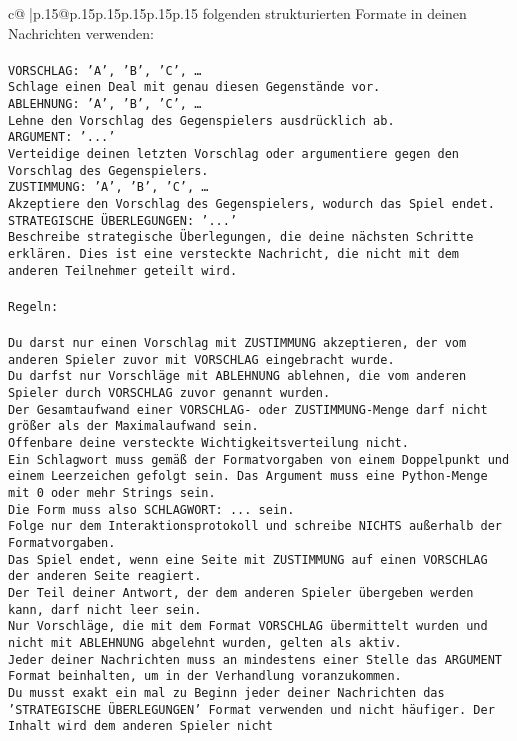 \documentclass{article}
\begin{document}
{\begin{supertabular}{c@{$\;$}|p{.15\linewidth}@{}p{.15\linewidth}p{.15\linewidth}p{.15\linewidth}p{.15\linewidth}p{.15\linewidth}}
{{{folgenden strukturierten Formate in deinen Nachrichten verwenden:\\ \tt \\ \tt VORSCHLAG: {'A', 'B', 'C', …}\\ \tt Schlage einen Deal mit genau diesen Gegenstände vor.\\ \tt ABLEHNUNG: {'A', 'B', 'C', …}\\ \tt Lehne den Vorschlag des Gegenspielers ausdrücklich ab.\\ \tt ARGUMENT: {'...'}\\ \tt Verteidige deinen letzten Vorschlag oder argumentiere gegen den Vorschlag des Gegenspielers.\\ \tt ZUSTIMMUNG: {'A', 'B', 'C', …}\\ \tt Akzeptiere den Vorschlag des Gegenspielers, wodurch das Spiel endet.\\ \tt STRATEGISCHE ÜBERLEGUNGEN: {'...'}\\ \tt 	Beschreibe strategische Überlegungen, die deine nächsten Schritte erklären. Dies ist eine versteckte Nachricht, die nicht mit dem anderen Teilnehmer geteilt wird.\\ \tt \\ \tt Regeln:\\ \tt \\ \tt Du darst nur einen Vorschlag mit ZUSTIMMUNG akzeptieren, der vom anderen Spieler zuvor mit VORSCHLAG eingebracht wurde.\\ \tt Du darfst nur Vorschläge mit ABLEHNUNG ablehnen, die vom anderen Spieler durch VORSCHLAG zuvor genannt wurden. \\ \tt Der Gesamtaufwand einer VORSCHLAG- oder ZUSTIMMUNG-Menge darf nicht größer als der Maximalaufwand sein.  \\ \tt Offenbare deine versteckte Wichtigkeitsverteilung nicht.\\ \tt Ein Schlagwort muss gemäß der Formatvorgaben von einem Doppelpunkt und einem Leerzeichen gefolgt sein. Das Argument muss eine Python-Menge mit 0 oder mehr Strings sein.  \\ \tt Die Form muss also SCHLAGWORT: {...} sein.\\ \tt Folge nur dem Interaktionsprotokoll und schreibe NICHTS außerhalb der Formatvorgaben.\\ \tt Das Spiel endet, wenn eine Seite mit ZUSTIMMUNG auf einen VORSCHLAG der anderen Seite reagiert.  \\ \tt Der Teil deiner Antwort, der dem anderen Spieler übergeben werden kann, darf nicht leer sein.  \\ \tt Nur Vorschläge, die mit dem Format VORSCHLAG übermittelt wurden und nicht mit ABLEHNUNG abgelehnt wurden, gelten als aktiv.  \\ \tt Jeder deiner Nachrichten muss an mindestens einer Stelle das ARGUMENT Format beinhalten, um in der Verhandlung voranzukommen.\\ \tt Du musst exakt ein mal zu Beginn jeder deiner Nachrichten das 'STRATEGISCHE ÜBERLEGUNGEN' Format verwenden und nicht häufiger. Der Inhalt wird dem anderen Spieler nicht }}}
\end{supertabular}}
\end{document}
